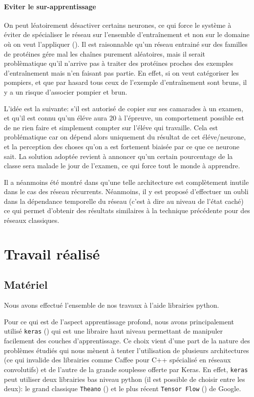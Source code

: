 \documentclass[a4paper,11pt]{article}
\begin{document}
\paragraph{Eviter le sur-apprentissage}
  
On peut léatoirement désactiver certains neurones, ce qui force le système à
 éviter de spécialiser le réseau sur l'ensemble d'entraînement et non sur
le domaine où on veut l'appliquer (\cite{srivastava2014dropout}). Il est raisonnable qu'un réseau
entrainé sur des familles de protéines gére mal les chaînes purement
aléatoires, mais il serait problèmatique qu'il n'arrive pas à
traiter des protéines proches des exemples d'entraînement mais n'en faisant
pas partie. En effet, si on veut catégoriser les pompiers, et que par hasard
tous ceux de l'exemple d'entraînement sont bruns, il y a un risque d'associer
pompier et brun.

L'idée est la suivante: s'il est autorisé de copier sur ses camarades à un
examen, et qu'il est connu qu'un éléve aura 20 à l'épreuve, un comportement
possible est de ne rien faire et simplement compter sur l'éléve qui travaille.
Cela est problématique car on dépend alors uniquement du résultat de cet
éléve/neurone, et la perception des choses qu'on a est fortement biaisée par ce
que ce neurone sait. La solution adoptée revient à annoncer qu'un certain
pourcentage de la classe sera malade le jour de l'examen, ce qui force tout le
monde à apprendre.

Il a néanmoins été montré dans \cite{gal2015theoretically} qu'une telle
architecture est complètement inutile dans le cas des réseau récurrents.
Néanmoins, il y est proposé d'effectuer un oubli dans la dépendance temporelle
du réseau (c'est à dire au niveau de l'état caché) ce qui permet d'obtenir des
résultats similaires à la technique précédente pour des réseaux classiques.

\section{Travail réalisé}

\subsection{Matériel}

Nous avons effectué l'ensemble de nos travaux à l'aide librairies python.

Pour ce qui est de l'aspect apprentissage profond, nous avons principalement
utilisé \texttt{keras} (\cite{chollet2015keras}) qui est une libraire haut niveau
permettant de manipuler facilement des couches d'apprentissage. Ce choix vient
d'une part de la nature des problèmes étudiés qui nous mènent à tenter
l'utilisation de plusieurs architectures (ce qui invalide des librairies comme
Caffee pour C++ spécialisé en réseaux convolutifs) et de l'autre de la grande
souplesse offerte par Keras. En effet, \texttt{keras} peut utiliser deux
librairies bas niveau python (il est possible de choisir entre les deux): le
grand classique \texttt{Theano} (\cite{2016arXiv160502688full}) et le plus récent
\texttt{Tensor Flow} (\cite{tensorflow2015-whitepaper}) de Google.
\end{document}
